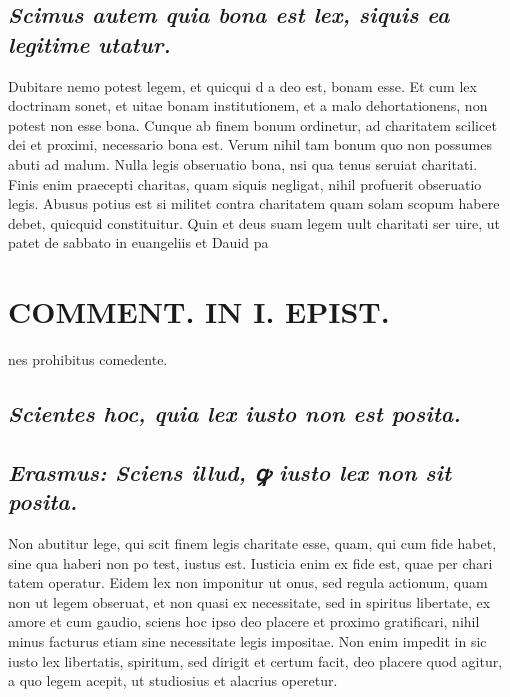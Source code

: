 \documentclass{article}
\begin{document}
\begin{pages}
\subsection*{\textit{Scimus autem quia bona est lex, siquis ea legitime utatur. }}\pstart Dubitare nemo potest legem, et quicqui d a deo est, bonam esse. Et cum lex doctrinam sonet, et uitae bonam institutionem, et a malo dehortationens, non potest non esse bona. Cunque ab finem bonum ordinetur, ad charitatem scilicet dei et proximi, necessario bona est. Verum nihil tam bonum quo non possumes abuti ad malum. Nulla legis obseruatio bona, nsi qua tenus seruiat charitati. Finis enim praecepti charitas, quam siquis negligat, nihil profuerit obseruatio legis. Abusus potius est si militet contra charitatem quam solam scopum habere debet, quicquid constituitur. Quin et deus suam legem uult charitati ser uire, ut patet de sabbato in euangeliis et Dauid pa  \pend
\section*{COMMENT. IN I. EPIST. }
\marginpar{[ p.18 ]}\pstart nes prohibitus comedente.  \pend
{}
{}
\subsection*{\textit{Scientes hoc, quia lex iusto non est posita. }}
{}
\subsection*{\textit{Erasmus: Sciens illud, ꝙ iusto lex non sit posita. }}\pstart Non abutitur lege, qui scit finem legis charitate esse, quam, qui cum fide habet, sine qua haberi non po test, iustus est. Iusticia enim ex fide est, quae per chari tatem operatur. Eidem lex non imponitur ut onus, sed regula actionum, quam non ut legem obseruat, et non quasi ex necessitate, sed in spiritus libertate, ex amore et cum gaudio, sciens hoc ipso deo placere et proximo gratificari, nihil minus facturus etiam sine necessitate legis impositae. Non enim impedit in sic iusto lex libertatis, spiritum, sed dirigit et certum facit, deo placere quod agitur, a quo legem acepit, ut studiosius et alacrius operetur.  \pend
{}
{}

\end{pages}
\end{document}
